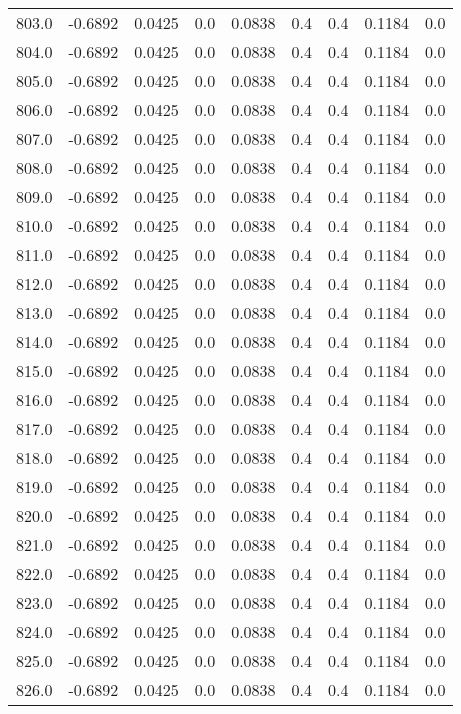 \begin{longtable}{lrrrrrrrr}
803.0 & -0.6892 & 0.0425 & 0.0 & 0.0838 & 0.4 & 0.4 & 0.1184 & 0.0 \\
804.0 & -0.6892 & 0.0425 & 0.0 & 0.0838 & 0.4 & 0.4 & 0.1184 & 0.0 \\
805.0 & -0.6892 & 0.0425 & 0.0 & 0.0838 & 0.4 & 0.4 & 0.1184 & 0.0 \\
806.0 & -0.6892 & 0.0425 & 0.0 & 0.0838 & 0.4 & 0.4 & 0.1184 & 0.0 \\
807.0 & -0.6892 & 0.0425 & 0.0 & 0.0838 & 0.4 & 0.4 & 0.1184 & 0.0 \\
808.0 & -0.6892 & 0.0425 & 0.0 & 0.0838 & 0.4 & 0.4 & 0.1184 & 0.0 \\
809.0 & -0.6892 & 0.0425 & 0.0 & 0.0838 & 0.4 & 0.4 & 0.1184 & 0.0 \\
810.0 & -0.6892 & 0.0425 & 0.0 & 0.0838 & 0.4 & 0.4 & 0.1184 & 0.0 \\
811.0 & -0.6892 & 0.0425 & 0.0 & 0.0838 & 0.4 & 0.4 & 0.1184 & 0.0 \\
812.0 & -0.6892 & 0.0425 & 0.0 & 0.0838 & 0.4 & 0.4 & 0.1184 & 0.0 \\
813.0 & -0.6892 & 0.0425 & 0.0 & 0.0838 & 0.4 & 0.4 & 0.1184 & 0.0 \\
814.0 & -0.6892 & 0.0425 & 0.0 & 0.0838 & 0.4 & 0.4 & 0.1184 & 0.0 \\
815.0 & -0.6892 & 0.0425 & 0.0 & 0.0838 & 0.4 & 0.4 & 0.1184 & 0.0 \\
816.0 & -0.6892 & 0.0425 & 0.0 & 0.0838 & 0.4 & 0.4 & 0.1184 & 0.0 \\
817.0 & -0.6892 & 0.0425 & 0.0 & 0.0838 & 0.4 & 0.4 & 0.1184 & 0.0 \\
818.0 & -0.6892 & 0.0425 & 0.0 & 0.0838 & 0.4 & 0.4 & 0.1184 & 0.0 \\
819.0 & -0.6892 & 0.0425 & 0.0 & 0.0838 & 0.4 & 0.4 & 0.1184 & 0.0 \\
820.0 & -0.6892 & 0.0425 & 0.0 & 0.0838 & 0.4 & 0.4 & 0.1184 & 0.0 \\
821.0 & -0.6892 & 0.0425 & 0.0 & 0.0838 & 0.4 & 0.4 & 0.1184 & 0.0 \\
822.0 & -0.6892 & 0.0425 & 0.0 & 0.0838 & 0.4 & 0.4 & 0.1184 & 0.0 \\
823.0 & -0.6892 & 0.0425 & 0.0 & 0.0838 & 0.4 & 0.4 & 0.1184 & 0.0 \\
824.0 & -0.6892 & 0.0425 & 0.0 & 0.0838 & 0.4 & 0.4 & 0.1184 & 0.0 \\
825.0 & -0.6892 & 0.0425 & 0.0 & 0.0838 & 0.4 & 0.4 & 0.1184 & 0.0 \\
826.0 & -0.6892 & 0.0425 & 0.0 & 0.0838 & 0.4 & 0.4 & 0.1184 & 0.0 \\

\end{longtable}
